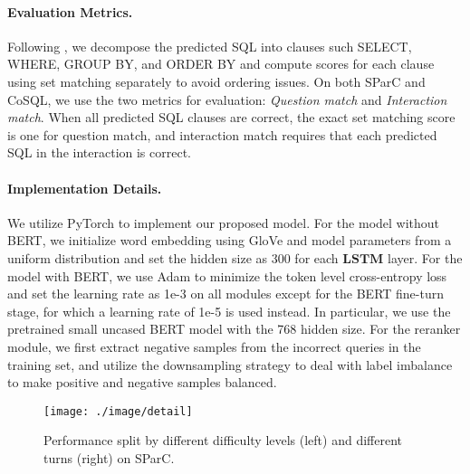 \documentclass[letterpaper]{article} \usepackage{aaai21}  \usepackage{times}  \usepackage{helvet} \usepackage{courier}  \usepackage[hyphens]{url}  \usepackage{graphicx} \urlstyle{rm} \def\UrlFont{\rm}  \usepackage{natbib}  \usepackage{caption} \frenchspacing  \setlength{\pdfpagewidth}{8.5in}  \setlength{\pdfpageheight}{11in}
\begin{document}
\paragraph{Evaluation Metrics.}
Following \cite{DBLP:conf/acl/YuZYTLLELPCJDPS19}, we decompose the predicted SQL into clauses such SELECT, WHERE, GROUP BY, and ORDER BY and compute scores for each clause using set matching separately to avoid ordering issues.
On both SParC and CoSQL, we use the two metrics for evaluation:
\textit{Question match} and \textit{Interaction match}.
When all predicted SQL clauses are correct, the exact set matching score is one for question match, and interaction match requires that each predicted SQL in the interaction is correct.

\paragraph{Implementation Details.}
We utilize PyTorch \cite{DBLP:conf/nips/PaszkeGMLBCKLGA19} to implement our proposed model.
For the model without BERT, we initialize word embedding using GloVe \cite{Pennington2014GloveGV} and model parameters from a uniform distribution and set the hidden size as 300 for each $\textbf{LSTM}$ layer.
For the model with BERT, we use Adam \cite{DBLP:journals/corr/KingmaB14} to minimize the token level cross-entropy loss and set the learning rate as 1e-3 on all modules except for the BERT fine-turn stage, for which a learning rate of 1e-5 is used instead.
In particular, we use the pretrained small uncased BERT model with the 768 hidden size.
For the reranker module, we first extract negative samples from the incorrect queries in the training set, and utilize the downsampling strategy to deal with label imbalance to make positive and negative samples balanced.

\begin{figure}
	\centering
	\texttt{[image: ./image/detail]}
	\caption{Performance split by different difficulty levels (left) and different turns (right) on SParC.}
	\label{detail}
\end{figure}
\end{document}
